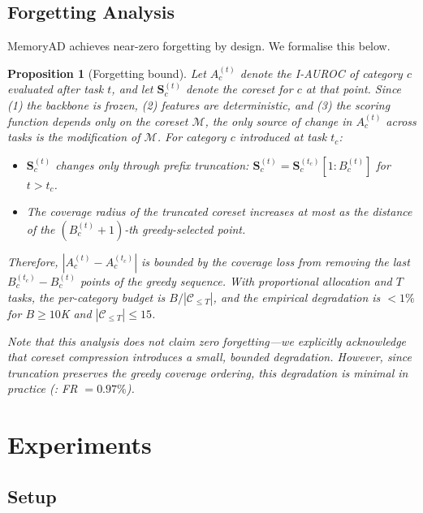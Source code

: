 \documentclass[conference]{IEEEtran}
\newcommand{\method}{MemoryAD}
\newtheorem{proposition}{Proposition}
\begin{document}
\subsection{Forgetting Analysis}
\label{sec:forgetting}

\method{} achieves near-zero forgetting by design. We formalise this below.
\begin{proposition}[Forgetting bound]
\label{prop:forgetting}
\textit{Let $A_c^{(t)}$ denote the I-AUROC of category $c$ evaluated after task $t$, and let $\mathbf{S}_c^{(t)}$ denote the coreset for $c$ at that point. Since (1) the backbone is frozen, (2) features are deterministic, and (3) the scoring function depends only on the coreset $\mathcal{M}$, the only source of change in $A_c^{(t)}$ across tasks is the modification of $\mathcal{M}$. For category $c$ introduced at task $t_c$:}
\begin{itemize}
    \item \textit{$\mathbf{S}_c^{(t)}$ changes only through prefix truncation: $\mathbf{S}_c^{(t)} = \mathbf{S}_c^{(t_c)}[1:B_c^{(t)}]$ for $t > t_c$.}
    \item \textit{The coverage radius of the truncated coreset increases at most as the distance of the $(B_c^{(t)}+1)$-th greedy-selected point.}
\end{itemize}
\textit{Therefore, $|A_c^{(t)} - A_c^{(t_c)}|$ is bounded by the coverage loss from removing the last $B_c^{(t_c)} - B_c^{(t)}$ points of the greedy sequence. With proportional allocation and $T$ tasks, the per-category budget is $B/|\mathcal{C}_{\leq T}|$, and the empirical degradation is $<1\%$ for $B \geq 10$K and $|\mathcal{C}_{\leq T}| \leq 15$.}

Note that this analysis does \emph{not} claim zero forgetting---we explicitly acknowledge that coreset compression introduces a small, bounded degradation. However, since truncation preserves the greedy coverage ordering, this degradation is minimal in practice (: FR $= 0.97\%$).

\section{Experiments}

\subsection{Setup}


\end{proposition}
\end{document}
